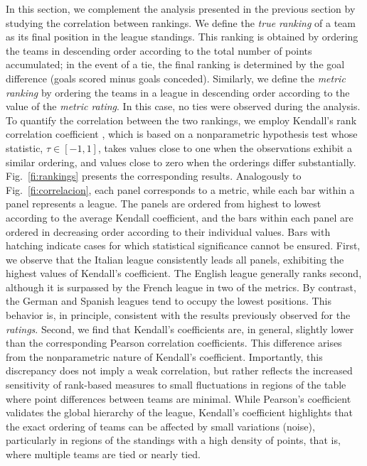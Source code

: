 \documentclass[preprint,12pt]{elsarticle}
\begin{document}
In this section, we complement the analysis presented in the previous section by studying the correlation between rankings.
%
We define the \textit{true ranking} of a team as its final position in the league standings.
%
This ranking is obtained by ordering the teams in descending order according to the total number of points accumulated; in the event of a tie, the final ranking is determined by the goal difference (goals scored minus goals conceded).
%
Similarly, we define the \textit{metric ranking} by ordering the teams in a league in descending order according to the value of the \textit{metric rating}.
%
In this case, no ties were observed during the analysis.
%
To quantify the correlation between the two rankings, we employ Kendall’s rank correlation coefficient \cite{kendall1938new}, which is based on a nonparametric hypothesis test whose statistic, $\tau \in [-1,1]$, takes values close to one when the observations exhibit a similar ordering, and values close to zero when the orderings differ substantially.
%
Fig.~\ref{fi:rankings} presents the corresponding results.
%
Analogously to Fig.~\ref{fi:correlacion}, each panel corresponds to a metric, while each bar within a panel represents a league.
%
The panels are ordered from highest to lowest according to the average Kendall coefficient, and the bars within each panel are ordered in decreasing order according to their individual values.
%
Bars with hatching indicate cases for which statistical significance cannot be ensured.
%
First, we observe that the Italian league consistently leads all panels, exhibiting the highest values of Kendall’s coefficient.
%
The English league generally ranks second, although it is surpassed by the French league in two of the metrics.
%
By contrast, the German and Spanish leagues tend to occupy the lowest positions.
%
This behavior is, in principle, consistent with the results previously observed for the \textit{ratings}.
%
Second, we find that Kendall’s coefficients are, in general, slightly lower than the corresponding Pearson correlation coefficients.
%
This difference arises from the nonparametric nature of Kendall’s coefficient.
%
Importantly, this discrepancy does not imply a weak correlation, but rather reflects the increased sensitivity of rank-based measures to small fluctuations in regions of the table where point differences between teams are minimal.
%
While Pearson’s coefficient validates the global hierarchy of the league, Kendall’s coefficient highlights that the exact ordering of teams can be affected by small variations (noise), particularly in regions of the standings with a high density of points, that is, where multiple teams are tied or nearly tied.
\end{document}
